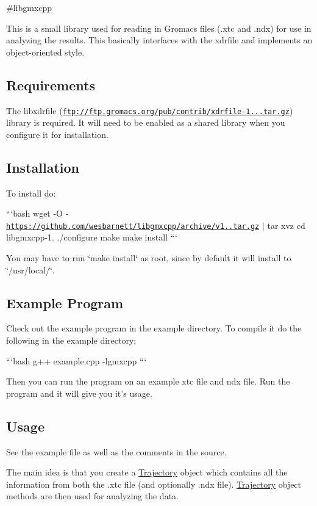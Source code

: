 \#libgmxcpp

This is a small library used for reading in Gromacs files (.xtc and .ndx) for use in analyzing the results. This basically interfaces with the xdrfile and implements an object-\/oriented style. 

\subsection*{Requirements}

The libxdrfile (\href{ftp://ftp.gromacs.org/pub/contrib/xdrfile-1.1.1.tar.gz}{\tt ftp\-://ftp.\-gromacs.\-org/pub/contrib/xdrfile-\/1...\-tar.\-gz}) library is required. It will need to be enabled as a shared library when you configure it for installation.

\subsection*{Installation}

To install do\-:

```bash wget -\/\-O -\/ \href{https://github.com/wesbarnett/libgmxcpp/archive/v1.0.tar.gz}{\tt https\-://github.\-com/wesbarnett/libgmxcpp/archive/v1..\-tar.\-gz} $\vert$ tar xvz cd libgmxcpp-\/1. ./configure make make install ```

You may have to run \char`\"{}make install\char`\"{} as root, since by default it will install to \char`\"{}/usr/local/\char`\"{}.

\subsection*{Example Program}

Check out the example program in the example directory. To compile it do the following in the example directory\-:

```bash g++ example.\-cpp -\/lgmxcpp ```

Then you can run the program on an example xtc file and ndx file. Run the program and it will give you it's usage.

\subsection*{Usage}

See the example file as well as the comments in the source.

The main idea is that you create a \hyperlink{classTrajectory}{Trajectory} object which contains all the information from both the .xtc file (and optionally .ndx file). \hyperlink{classTrajectory}{Trajectory} object methods are then used for analyzing the data.

